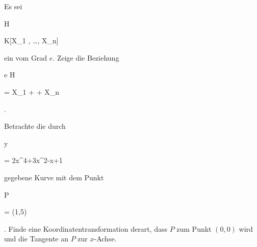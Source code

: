 {} {}



{}

{


Es sei


\mavergleichskette

{\vergleichskette

{ H
}

{ \in }{ K[X_1 , \ldots , X_n]
}

{  }{
}

{    }{
}

{   }{
}

}
{}{}{}
ein
 {} {}
vom Grad $e$. Zeige die Beziehung


\mavergleichskettedisp

{\vergleichskette

{ e H
}

{ =} { X_1 {  } + \cdots + X_n {  }
}

{ } {
}

{ } {
}

{ } {
}

}
{}{}{.}


}

{} {}



{}

{


Betrachte die durch


\mavergleichskette

{\vergleichskette

{ y
}

{ = }{ 2x^4+3x^2-x+1
}

{  }{
}

{    }{
}

{   }{
}

}
{}{}{}
gegebene Kurve mit dem Punkt


\mavergleichskette

{\vergleichskette

{ P
}

{ = }{ (1,5)
}

{  }{
}

{    }{
}

{   }{
}

}
{}{}{.}
Finde eine Koordinatentransformation derart, dass $P$ zum Punkt $(0,0)$ wird und die Tangente an $P$ zur $x$-Achse.


}

